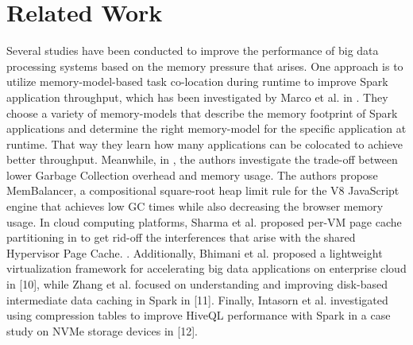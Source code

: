 \section{Related Work}

\iffalse
To address the challenges of lack of system memory, researchers have proposed various
techniques to optimize the performance of Big data analytics, including
utilizing remote memory, memory scheduling, and offloading to local storage.

Some Meta researchers built a new memory scheduling mechanism to investigate the oportunities
for reducing memory pressure and improve server throughput in their work called Transparent Memory Offloading in Datacenters (TMO)
\cite{TMO}. Amaro et. al investigate the utilization of remote memory to improve job throughput \cite{CFM} building a swapping mechnism that uses memory
from remote servers as swap memory.
\fi


Several studies have been conducted to improve the performance of big
data processing systems based on the memory pressure that arises. One approach is to utilize memory-model-based task
co-location during runtime to improve Spark application throughput, which has been
investigated by Marco et al. in \cite{Colocation}. They choose a variety of memory-models
that describe the memory footprint of Spark applications and determine the right memory-model
for the specific application at runtime. That way they learn how many applications can be colocated
to achieve better throughput.
Meanwhile, in \cite{Limits}, the authors investigate the trade-off between lower Garbage Collection overhead and memory usage. The authors propose MemBalancer, a compositional square-root heap limit rule for the
V8 JavaScript engine that achieves low GC times while also decreasing the browser memory usage.
In cloud computing platforms, Sharma
et al. proposed per-VM page cache partitioning in \cite{PC} 
to get rid-off the interferences that arise with the shared Hypervisor Page Cache.
\iffalse
{}. Additionally, Bhimani et al. proposed
a lightweight virtualization framework for accelerating big data
applications on enterprise cloud in [10], while Zhang et al. focused
on understanding and improving disk-based intermediate data caching in
Spark in [11]. Finally, Intasorn et al. investigated using compression
tables to improve HiveQL performance with Spark in a case study on
NVMe storage devices in [12]. 


